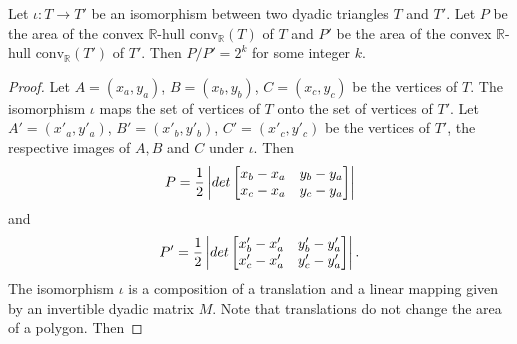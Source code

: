 \documentclass[10pt,a4paper]{amsart}
\def\mbR{\mathbb{R}}
\def\mr{\mathrm}
\begin{document}
\begin{proposition}\label{P:area}
Let $\iota:T \rightarrow T'$ be an isomorphism between two dyadic triangles $T$ and $T'$. Let
$P$ be the area of the convex $\mbR$-hull $\mr{conv}_{\mbR}(T)$ of $T$ and $P'$ be the area of
the convex $\mbR$-hull $\mr{conv}_{\mbR}(T')$ of $T'$. Then $ P/P' = 2^k$ for some integer $k$.
\end{proposition}

\begin{proof}
Let $A = (x_a,y_a)$, $B = (x_b,y_b)$, $C = (x_c,y_c)$ be the vertices of $T$. The isomorphism
$\iota$ maps the set of vertices of $T$ onto the set of vertices of $T'$. Let $A' =
(x'_a,y'_a)$, $B' = (x'_b,y'_b)$, $C' = (x'_c,y'_c)$ be the vertices of $T'$, the respective
images of $A,B$ and $C$ under $\iota$.
Then	
\[
		P = \frac{1}{2}\left| \rm{det}
		\begin{bmatrix}
			x_b-x_a&y_b-y_a\\
		    x_c-x_a&y_c-y_a
		\end{bmatrix}\right|
\]	
and
\[
		P' = \frac{1}{2} \left|\rm{det}
		\begin{bmatrix}
			x'_b-x'_a&y'_b-y'_a\\
			x'_c-x'_a&y'_c-y'_a
		\end{bmatrix}\right|.
\]
The isomorphism $\iota$ is a composition of a translation and a linear mapping given by an
invertible dyadic matrix $M$. Note that translations do not change the area of a polygon. Then


\end{proof}
\end{document}
